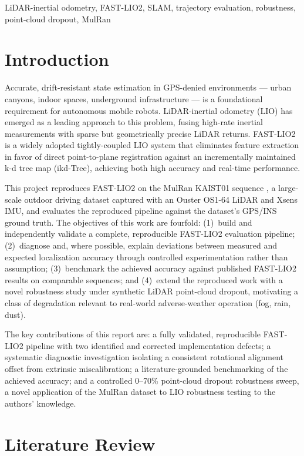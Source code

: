 \documentclass[conference]{IEEEtran}
\begin{document}
\begin{IEEEkeywords}
LiDAR-inertial odometry, FAST-LIO2, SLAM, trajectory evaluation, robustness, point-cloud dropout, MulRan
\end{IEEEkeywords}

\section{Introduction}
Accurate, drift-resistant state estimation in GPS-denied environments --- urban canyons, indoor spaces, underground infrastructure --- is a foundational requirement for autonomous mobile robots. LiDAR-inertial odometry (LIO) has emerged as a leading approach to this problem, fusing high-rate inertial measurements with sparse but geometrically precise LiDAR returns. FAST-LIO2 \cite{fastlio2} is a widely adopted tightly-coupled LIO system that eliminates feature extraction in favor of direct point-to-plane registration against an incrementally maintained k-d tree map (ikd-Tree), achieving both high accuracy and real-time performance.

This project reproduces FAST-LIO2 on the MulRan KAIST01 sequence \cite{mulran}, a large-scale outdoor driving dataset captured with an Ouster OS1-64 LiDAR and Xsens IMU, and evaluates the reproduced pipeline against the dataset's GPS/INS ground truth. The objectives of this work are fourfold: (1)~build and independently validate a complete, reproducible FAST-LIO2 evaluation pipeline; (2)~diagnose and, where possible, explain deviations between measured and expected localization accuracy through controlled experimentation rather than assumption; (3)~benchmark the achieved accuracy against published FAST-LIO2 results on comparable sequences; and (4)~extend the reproduced work with a novel robustness study under synthetic LiDAR point-cloud dropout, motivating a class of degradation relevant to real-world adverse-weather operation (fog, rain, dust).

The key contributions of this report are: a fully validated, reproducible FAST-LIO2 pipeline with two identified and corrected implementation defects; a systematic diagnostic investigation isolating a consistent rotational alignment offset from extrinsic miscalibration; a literature-grounded benchmarking of the achieved accuracy; and a controlled 0--70\% point-cloud dropout robustness sweep, a novel application of the MulRan dataset to LIO robustness testing to the authors' knowledge.

\section{Literature Review}
\end{document}
